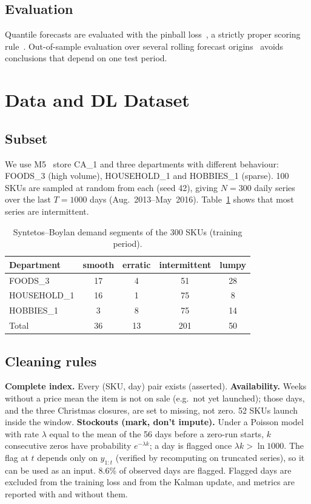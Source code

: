 \documentclass[conference]{IEEEtran}
\begin{document}
\subsection{Evaluation}
Quantile forecasts are evaluated with the pinball loss~\cite{koenker1978quantile}, a strictly proper scoring rule~\cite{gneiting2007proper}.
Out-of-sample evaluation over several rolling forecast origins~\cite{tashman2000rolling,hyndman2021fpp3} avoids conclusions that depend on one test period.

\section{Data and DL Dataset}
\subsection{Subset}
We use M5~\cite{makridakis2022m5} store CA\_1 and three departments with different behaviour: FOODS\_3 (high volume),
HOUSEHOLD\_1 and HOBBIES\_1 (sparse). 100 SKUs are sampled at random from each (seed 42), giving $N=300$ daily series over the last
$T=1000$ days (Aug.~2013--May~2016). Table~\ref{tab:segments} shows that most series are intermittent.

\begin{table}[t]
\centering
\caption{Syntetos--Boylan demand segments of the 300 SKUs (training period).}
\label{tab:segments}
\begin{tabular}{lcccc}
\toprule
Department & smooth & erratic & intermittent & lumpy\\
\midrule
FOODS\_3 & 17 & 4 & 51 & 28\\
HOUSEHOLD\_1 & 16 & 1 & 75 & 8\\
HOBBIES\_1 & 3 & 8 & 75 & 14\\
\midrule
Total & 36 & 13 & 201 & 50\\
\bottomrule
\end{tabular}
\end{table}

\subsection{Cleaning rules}
\textbf{Complete index.} Every (SKU, day) pair exists (asserted).
\textbf{Availability.} Weeks without a price mean the item is not on sale (e.g.\ not yet launched); those days, and the three Christmas
closures, are set to missing, not zero. 52 SKUs launch inside the window.
\textbf{Stockouts (mark, don't impute).} Under a Poisson model with rate $\lambda$ equal to the mean of the 56 days before a zero-run starts,
$k$ consecutive zeros have probability $e^{-\lambda k}$; a day is flagged once $\lambda k>\ln 1000$. The flag at $t$ depends only on
$y_{1:t}$ (verified by recomputing on truncated series), so it can be used as an input. 8.6\% of observed days are flagged.
Flagged days are excluded from the training loss and from the Kalman update, and metrics are reported with and without them.
\end{document}
